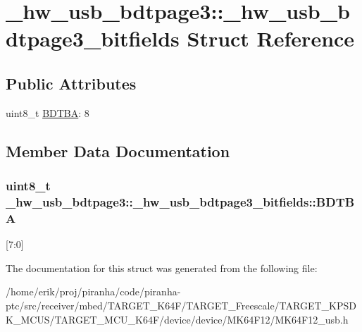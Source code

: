 \hypertarget{struct__hw__usb__bdtpage3_1_1__hw__usb__bdtpage3__bitfields}{}\section{\+\_\+hw\+\_\+usb\+\_\+bdtpage3\+:\+:\+\_\+hw\+\_\+usb\+\_\+bdtpage3\+\_\+bitfields Struct Reference}
\label{struct__hw__usb__bdtpage3_1_1__hw__usb__bdtpage3__bitfields}
\subsection*{Public Attributes}
\begin{DoxyCompactItemize}
\item 
uint8\+\_\+t \hyperlink{struct__hw__usb__bdtpage3_1_1__hw__usb__bdtpage3__bitfields_aebf34dbab31ad54adc0cd75389962bf7}{B\+D\+T\+BA}\+: 8
\end{DoxyCompactItemize}


\subsection{Member Data Documentation}
\subsubsection[{\texorpdfstring{B\+D\+T\+BA}{BDTBA}}]{\setlength{\rightskip}{0pt plus 5cm}uint8\+\_\+t \+\_\+hw\+\_\+usb\+\_\+bdtpage3\+::\+\_\+hw\+\_\+usb\+\_\+bdtpage3\+\_\+bitfields\+::\+B\+D\+T\+BA}\hypertarget{struct__hw__usb__bdtpage3_1_1__hw__usb__bdtpage3__bitfields_aebf34dbab31ad54adc0cd75389962bf7}{}\label{struct__hw__usb__bdtpage3_1_1__hw__usb__bdtpage3__bitfields_aebf34dbab31ad54adc0cd75389962bf7}
\mbox{[}7\+:0\mbox{]} 

The documentation for this struct was generated from the following file\+:\begin{DoxyCompactItemize}
\item 
/home/erik/proj/piranha/code/piranha-\/ptc/src/receiver/mbed/\+T\+A\+R\+G\+E\+T\+\_\+\+K64\+F/\+T\+A\+R\+G\+E\+T\+\_\+\+Freescale/\+T\+A\+R\+G\+E\+T\+\_\+\+K\+P\+S\+D\+K\+\_\+\+M\+C\+U\+S/\+T\+A\+R\+G\+E\+T\+\_\+\+M\+C\+U\+\_\+\+K64\+F/device/device/\+M\+K64\+F12/M\+K64\+F12\+\_\+usb.\+h\end{DoxyCompactItemize}
